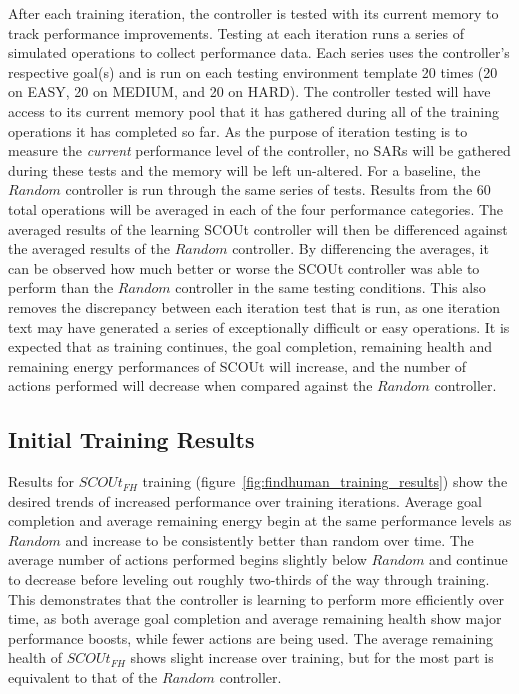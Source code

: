 After each training iteration, the controller is tested with its current memory to track performance improvements.
Testing at each iteration runs a series of simulated operations to collect performance data.
Each series uses the controller's respective goal(s) and is run on each testing environment template 20 times (20 on EASY, 20 on MEDIUM, and 20 on HARD).
The controller tested will have access to its current memory pool that it has gathered during all of the training operations it has completed so far.
As the purpose of iteration testing is to measure the \textit{current} performance level of the controller, no SARs will be gathered during these tests and the memory will be left un-altered.
For a baseline, the $Random$ controller is run through the same series of tests.
Results from the 60 total operations will be averaged in each of the four performance categories.
The averaged results of the learning SCOUt controller will then be differenced against the averaged results of the $Random$ controller.
By differencing the averages, it can be observed how much better or worse the SCOUt controller was able to perform than the $Random$ controller in the same testing conditions.
This also removes the discrepancy between each iteration test that is run, as one iteration text may have generated a series of exceptionally difficult or easy operations.
It is expected that as training continues, the goal completion, remaining health and remaining energy performances of SCOUt will increase, and the number of actions performed will decrease when compared against the $Random$ controller.

\subsection{Initial Training Results}
Results for $SCOUt_{FH}$ training (figure~\ref{fig:findhuman_training_results}) show the desired trends of increased performance over training iterations.
Average goal completion and average remaining energy begin at the same performance levels as $Random$ and increase to be consistently better than random over time.
The average number of actions performed begins slightly below $Random$ and continue to decrease before leveling out roughly two-thirds of the way through training.
This demonstrates that the controller is learning to perform more efficiently over time, as both average goal completion and average remaining health show major performance boosts, while fewer actions are being used.
The average remaining health of $SCOUt_{FH}$ shows slight increase over training, but for the most part is equivalent to that of the $Random$ controller.

